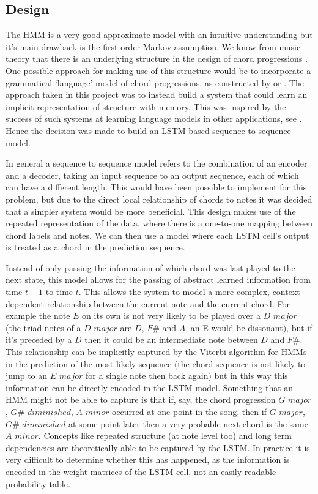 \documentclass[bsc,singlespacing,logo, parskip, deptreport]{infthesis}
\begin{document}
\subsection{Design}
The HMM is a very good approximate model with an intuitive understanding but it's main drawback is the first order Markov assumption. We know from music theory that there is an underlying structure in the design of chord progressions \cite{krumhansl1982perceived} \cite{piston1948harmony}. One possible approach for making use of this structure would be to incorporate a grammatical `language' model of chord progressions, as constructed by \cite{granroth2014robust} or \cite{rohrmeier2007generative}. The approach taken in this project was to instead build a system that could learn an implicit representation of structure with memory. This was inspired by the success of such systems at learning language models in other applications, see \cite{schmidhuber2002learning} \cite{sundermeyer2012lstm}. Hence the decision was made to build an LSTM based sequence to sequence model.

In general a sequence to sequence model refers to the combination of an encoder and a decoder, taking an input sequence to an output sequence, each of which can have a different length. This would have been possible to implement for this problem, but due to the direct local relationship of chords to notes it was decided that a simpler system would be more beneficial. This design makes use of the repeated representation of the data, where there is a one-to-one mapping between chord labels and notes. We can then use a model where each LSTM cell's output is treated as a chord in the prediction sequence.

Instead of only passing the information of which chord was last played to the next state, this model allows for the passing of abstract learned information from time $t-1$ to time $t$. This allows the system to model a more complex, context-dependent relationship between the current note and the current chord. For example the note $E$ on its own is not very likely to be played over a $D$ $major$ (the triad notes of a $D$ $major$ are $D$, $F\#$ and $A$, an E would be dissonant), but if it's preceded by a $D$ then it could be an intermediate note between $D$ and $F\#$. This relationship can be implicitly captured by the Viterbi algorithm for HMMs in the prediction of the most likely sequence (the chord sequence is not likely to jump to an $E$ $major$ for a single note then back again) but in this way this information can be directly encoded in the LSTM model. Something that an HMM might not be able to capture is that if, say, the chord progression $G$ $major$, $G\#$ $diminished$, $A$ $minor$ occurred at one point in the song, then if $G$ $major$, $G\#$ $diminished$ at some point later then a very probable next chord is the same $A$ $minor$. Concepts like repeated structure (at note level too) and long term dependencies are theoretically able to be captured by the LSTM. In practice it is very difficult to determine whether this has happened, as the information is encoded in the weight matrices of the LSTM cell, not an easily readable probability table.
\end{document}
